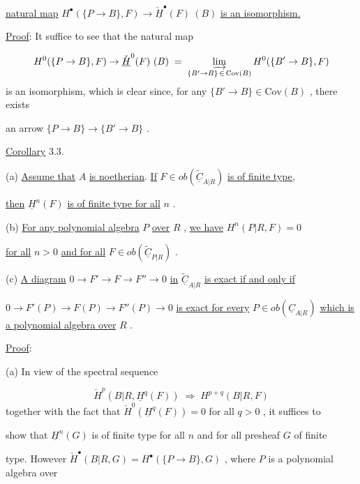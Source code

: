 \underline{natural map}  $H^{\bullet}(\{P \to B\},F) \to \check{\underline{H}}^{\bullet}(F)\ (B)$  \underline{is an isomorphism.}

\underline{Proof}:  It suffice to see that the natural map

\begin{equation*}
H^{0}(\{P \to B\},F) \to \check{\underline{H}}^{0}(F)\ (B) \;=\; \varinjlim_{\{B' \to B\}\, \in\, \mathrm{Cov}(B)} H^{0}(\{B' \to B\},F)
\end{equation*}
is an isomorphism, which is clear since, for any  $\{B' \to B\} \in \mathrm{Cov}(B)$  , there exists

an arrow  $\{P \to B\} \to \{B' \to B\}$  .


\underline{Corollary} 3.3.

(a)  \underline{Assume that}  $A$  \underline{is noetherian}. \underline{If}  $F \in ob(\widetilde{\underline{C}}_{A|R})$  \underline{is of finite type,}

\underline{then}  $\underline{H}^{n}(F)$  \underline{is of finite type for all}  $n$  .

(b)  \underline{For any polynomial algebra}  $P$  \underline{over}  $R$  , \underline{we have}  $H^{n}(P|R,F) = 0$

\underline{for all}  $n > 0$  \underline{and for all}  $F \in ob(\widetilde{\underline{C}}_{P|R})$  .

(c)  \underline{A diagram}  $0 \to F' \to F \to F'' \to 0$  \underline{in}  $\widetilde{\underline{C}}_{A|R}$  \underline{is exact if and only if}

$0 \to F'(P) \to F(P) \to F''(P) \to 0$  \underline{is exact for every}  $P \in ob(\underline{C}_{A|R})$  \underline{which is a polynomial algebra over}  $R$  .

\underline{Proof}:

(a)  In view of the spectral sequence

\begin{equation*}
\check{H}^{p}(B|R,\underline{H}^{q}(F)) \;\Rightarrow\; H^{p+q}(B|R,F)
\end{equation*}
together with the fact that  $\check{H}^{0}(\underline{H}^{q}(F)) = 0$  for all  $q > 0$  , it suffices to

show that  $\underline{H}^{n}(G)$  is of finite type for all  $n$  and for all presheaf  $G$  of finite

type. However  $\check{H}^{\bullet}(B|R,G) = H^{\bullet}(\{P \to B\},G)$  , where  $P$  is a polynomial algebra over

